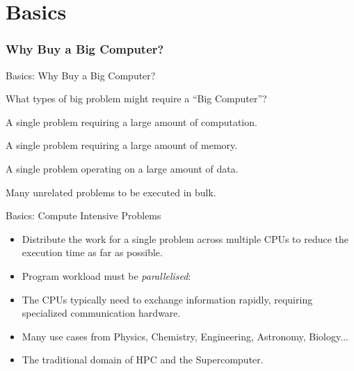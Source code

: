 \part{Basics}
\frame{\partpage}

\section{Why Buy a Big Computer?}

\begin{frame}{Basics: Why Buy a Big Computer?}

What types of big problem might require a ``Big Computer''?

\begin{description}
\pause
\item[\textit{Compute Intensive:}]{A single problem requiring a large amount of computation.}
\pause
\item[\textit{Memory Intensive:}]{A single problem requiring a large amount of memory.}
\pause
\item[\textit{Data Intensive:}]{A single problem operating on a large amount of data.}
\pause
\item[\textit{High Throughput:}]{Many unrelated problems to be executed in bulk.}
\end{description}
\end{frame}

\begin{frame}{Basics: Compute Intensive Problems}
\begin{itemize}
\item{Distribute the \alert{work} for a \alert{single problem} across multiple CPUs to reduce the execution time as far as possible.}
\pause
\item{Program workload must be \emph{parallelised}:}
\pause
\item{The CPUs typically need to exchange information rapidly, requiring specialized communication hardware.}
\pause
\item{Many use cases from Physics, Chemistry, Engineering, Astronomy, Biology...}
\item{The traditional domain of \alert{HPC} and the \alert{Supercomputer}.}
\end{itemize}
\end{frame}

